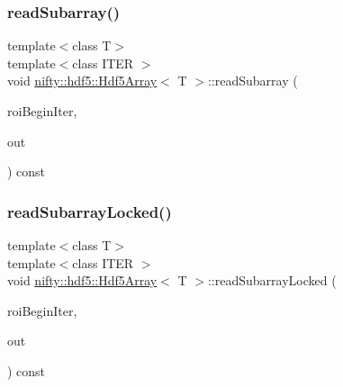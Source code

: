 \mbox{\label{classnifty_1_1hdf5_1_1Hdf5Array_a25f997d6ad4bc0399afa4e2605f229f2}} 
\subsubsection{\texorpdfstring{read\+Subarray()}{readSubarray()}}
{\footnotesize\ttfamily template$<$class T$>$ \\
template$<$class I\+T\+ER $>$ \\
void \hyperlink{classnifty_1_1hdf5_1_1Hdf5Array}{nifty\+::hdf5\+::\+Hdf5\+Array}$<$ T $>$\+::read\+Subarray (\begin{DoxyParamCaption}\item[{I\+T\+ER}]{roi\+Begin\+Iter,  }\item[{\hyperlink{classandres_1_1View}{marray\+::\+View}$<$ T $>$ \&}]{out }\end{DoxyParamCaption}) const\hspace{0.3cm}{\ttfamily [inline]}}

\mbox{\label{classnifty_1_1hdf5_1_1Hdf5Array_a28ca00a795e9cc8e9be100b1955b7d93}} 
\subsubsection{\texorpdfstring{read\+Subarray\+Locked()}{readSubarrayLocked()}}
{\footnotesize\ttfamily template$<$class T$>$ \\
template$<$class I\+T\+ER $>$ \\
void \hyperlink{classnifty_1_1hdf5_1_1Hdf5Array}{nifty\+::hdf5\+::\+Hdf5\+Array}$<$ T $>$\+::read\+Subarray\+Locked (\begin{DoxyParamCaption}\item[{I\+T\+ER}]{roi\+Begin\+Iter,  }\item[{\hyperlink{classandres_1_1View}{marray\+::\+View}$<$ T $>$ \&}]{out }\end{DoxyParamCaption}) const\hspace{0.3cm}{\ttfamily [inline]}}

